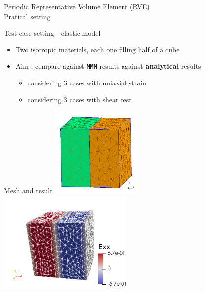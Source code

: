 \documentclass{beamer}
\newcommand{\mmm}{\texttt{MMM}}
\begin{document}
\begin{frame}{Periodic
    Representative Volume Element (RVE)\\\hspace*{1cm}
    Pratical setting}
  \begin{block}{Test
      case setting - elastic model}
    \protect\hypertarget{test-case-setting---elastic-model}{}
    \begin{itemize}
      \item Two isotropic materials, each one filling half of
      a cube
      \item Aim : compare against \textbf{\mmm{}}
      results against \textbf{analytical} results
      \begin{itemize}
        \item considering 3 cases with uniaxial strain
        \item considering 3 cases with shear test
      \end{itemize}
    \end{itemize}
  \end{block}
  \begin{block}{Mesh
      and result} \vspace*{-5mm}
    \includegraphics[width=0.33\textwidth]{img/cube_2mat.png}
    \includegraphics[width=0.49\textwidth]{img/cube_2mat_exx.png}
    \vspace*{-1mm}
  \end{block}
\end{frame}
\end{document}
